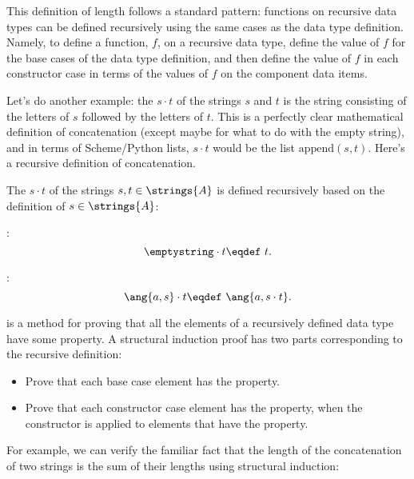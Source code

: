 This definition of length follows a standard pattern: functions on
recursive data types can be defined recursively using the same cases as
the data type definition.  Namely, to define a function, $f$, on a
recursive data type, define the value of $f$ for the base cases of the
data type definition, and then define the value of $f$ in each constructor
case in terms of the values of $f$ on the component data items.

Let's do another example: the  $s\cdot t$ of the
strings $s$ and $t$ is the string consisting of the letters of $s$
followed by the letters of $t$.  This is a perfectly clear mathematical
definition of concatenation (except maybe for what to do with the empty
string), and in terms of Scheme/Python lists, $s\cdot t$ would be the list
$\text{append}(s, t)$.  Here's a recursive definition of concatenation.

\begin{definition}\label{concat_def}
The  $s\cdot t$ of the strings $s,t \in
\strings{A}$ is defined recursively based on the definition of $s \in
\strings{A}$:

\item {}:     %
\[
\emptystring \cdot t \eqdef\ t.
\]

\item {}: %
\[
\ang{a,s} \cdot t \eqdef\ \ang{a, s \cdot t}.
\]
\end{definition}

 is a method for proving that all the elements
of a recursively defined data type have some property.  A structural
induction proof has two parts corresponding to the recursive definition:
\begin{itemize}
\item Prove that each base case element has the property.
\item Prove that each constructor case element has the property, when
  the constructor is applied to elements that have the property.
\end{itemize}

For example, we can verify the familiar fact that the length of the
concatenation of two strings is the sum of their lengths using structural
induction:

